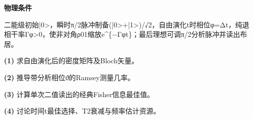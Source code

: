 \textbf{物理条件}\par 二能级初始|0>，瞬时π/2脉冲制备(|0>+|1>)/√2，自由演化t时相位φ=Δt，纯退相干率Γφ>0，使非对角ρ01缩放e\textasciicircum{}\{−Γφt\}；最后理想可调π/2分析脉冲并读出布居。
\par\noindent\textbf{(1)} 求自由演化后的密度矩阵及Bloch矢量。
\par\noindent\textbf{(2)} 推导带分析相位ϑ的Ramsey测量几率。
\par\noindent\textbf{(3)} 计算单次二值读出的经典Fisher信息最佳值。
\par\noindent\textbf{(4)} 讨论时间t最佳选择、T2衰减与频率估计资源。
